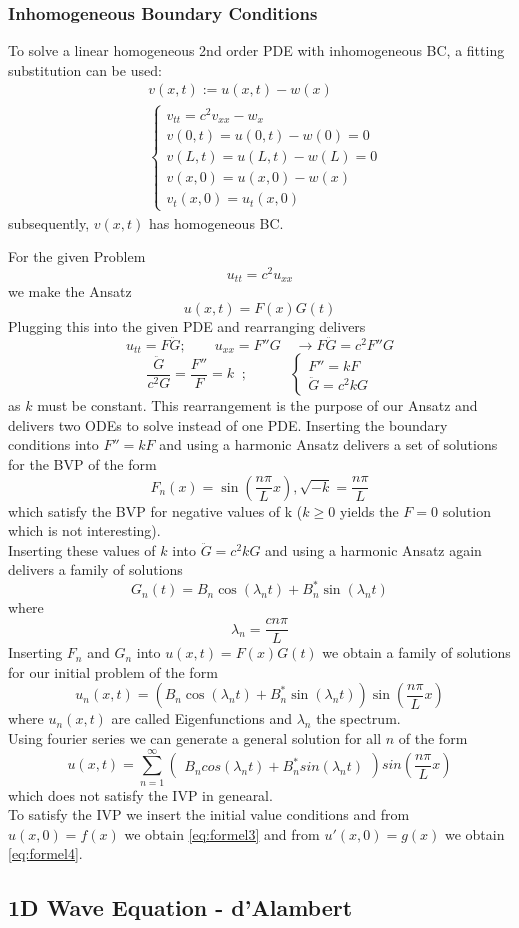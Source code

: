 \subsubsection{Inhomogeneous Boundary Conditions}
To solve a linear homogeneous 2nd order PDE with inhomogeneous BC, a fitting substitution can be used:
\begin{align*}
    &v(x,t):= u(x,t) -w(x)\\
    &\begin{cases}
        v_{tt}=c^2v_{xx}-w_x\\
        v(0,t)=u(0,t)-w(0)=0\\
        v(L,t)=u(L,t)-w(L)=0\\
        v(x,0)=u(x,0)-w(x)\\
        v_t(x,0)=u_t(x,0)
    \end{cases}
\end{align*}
subsequently, $v(x,t)$ has homogeneous BC.\@
%
%
\begin{examplesection}[Example]
For the given Problem
\[ u_{tt}=c^2u_{xx}\]
we make the Ansatz
\[u(x,t)=F(x)G(t)\]
Plugging this into the given PDE and rearranging delivers
\[u_{tt}=F\ddot{G};\qquad u_{xx}=F''G \quad \rightarrow F\ddot{G}=c^2F''G\]
\[\frac{\ddot{G}}{c^2G}=\frac{F''}{F}=k\;\; ;\qquad\quad\begin{cases} F''=kF\\
\ddot{G}=c^2kG
\end{cases}\]
as $k$ must be constant. This rearrangement is the purpose of our Ansatz and delivers two ODEs to solve instead of one PDE.
Inserting the boundary conditions into $F''=kF$ and using a harmonic Ansatz delivers a set of solutions for the BVP of the form
\[F_n (x)=\sin{\left( \frac{n \pi}{L} x \right) }, \sqrt{-k}=\frac{n \pi}{L}\]
which satisfy the BVP for negative values of k ($k \ge 0$ yields the $F=0$ solution which is not interesting).\\
Inserting these values of $k$ into $\ddot{G}=c^2kG$ and using a harmonic Ansatz again delivers a family of solutions
\[G_n (t) =  B_n \cos{(\lambda_{n} t)} + B_n^* \sin{(\lambda_{n}t)}\]
where 
\[ \lambda_{n} = \frac{c n \pi}{L} \] 
Inserting $F_n$ and $G_n$ into $u(x,t)=F(x)G(t)$ we obtain a family of solutions for our initial problem of the form
\[u_n (x, t) = (B_n \cos{(\lambda_{n} t)} + B_n^* \sin{(\lambda_{n}t)})\sin{\left( \frac{n \pi}{L} x \right) } \]
where $u_n (x, t)$ are called Eigenfunctions and $\lambda_n$ the spectrum.\\
Using fourier series we can generate a general solution for all $n$ of the form
\[u(x,t)=\sum\limits_{n=1}^{\infty}\begin{pmatrix}
    B_n cos(\lambda _n t)+B_n^* sin(\lambda_n t)
    \end{pmatrix} sin\left(\frac{n \pi}{L}x \right) \]
which does not satisfy the IVP in genearal.\\
To satisfy the IVP we insert the initial value conditions and from $u(x,0)=f(x)$ we obtain \ref*{eq:formel3} and from $u'(x,0)=g(x)$ we obtain \ref*{eq:formel4}.
\end{examplesection}
\subsection{1D Wave Equation - d'Alambert}

